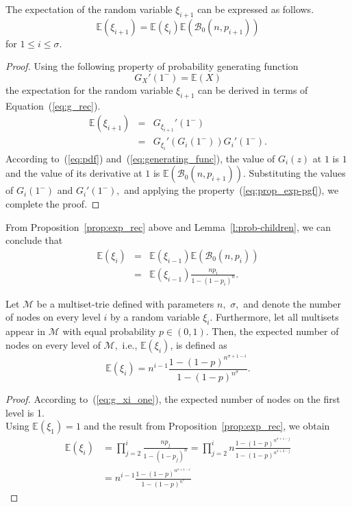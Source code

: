 \documentclass[algorithms,article,accept,pdftex,moreauthors]{Definitions/mdpi}
\begin{document}
\begin{Proposition}\label{prop:exp_rec}
The expectation of the random variable $\xi_{i+1}$ can be expressed 
as follows.
\[
\mathbb{E}(\xi_{i+1}) = \mathbb{E}(\xi_i)\mathbb{E}(\mathcal{B}_0(n,p_{i+1}))
\]
for $1\leq i\leq\sigma.$
\end{Proposition}
\begin{proof}
Using the following property of probability generating function
\begin{equation}\label{eq:prop_exp-pgf}
G_X'(1^-) = \mathbb{E}(X)
\end{equation}
the expectation for the random variable $\xi_{i+1}$ can be derived in terms of Equation~(\ref{eq:g_rec}).
\begin{eqnarray}\label{eq:exp}
\mathbb{E}(\xi_{i+1}) &=& G_{\xi_{i+1}}'(1^-) \nonumber \\
&=& G_{\xi_i}'(G_i(1^-))G_i'(1^-).
\end{eqnarray}
According to~(\ref{eq:pdf}) and~(\ref{eq:generating_func}), the value of $G_i(z)$ at 
$1$ is $1$ and the value of its derivative at $1$ is $\mathbb{E}(\mathcal{B}_0(n,p_{i+1})).$ 
Substituting the values of $G_i(1^-)$ and $G_i'(1^-),$ and applying the 
property~(\ref{eq:prop_exp-pgf}), we complete the proof.
\end{proof}
%
From Proposition~\ref{prop:exp_rec} above and Lemma~\ref{l:prob-children}, we 
can conclude that 
\begin{eqnarray}
\mathbb{E}(\xi_{i}) &=& \mathbb{E}(\xi_{i-1})\mathbb{E}\left( \mathcal{B}_0(n,p_{i}) \right) \nonumber \\
& = & \mathbb{E}(\xi_{i-1})\frac{np_{i}}{1-(1-p_{i})^n}.
\end{eqnarray}

\begin{Theorem}\label{thm:exp_level}
Let $\mathcal{M}$ be a multiset-trie defined with parameters $n,$ $\sigma,$ and denote the number 
of nodes on every level $i$ by a random variable $\xi_i.$ Furthermore, let all multisets appear in 
$\mathcal{M}$ with equal probability $p\in (0,1).$ Then, the expected number 
of nodes on every level of $\mathcal{M},$ i.e., $\mathbb{E}(\xi_i)$, is defined as 
\begin{equation}\label{eq:nodes_level}
\mathbb{E}(\xi_{i}) = n^{i-1} \frac{1-(1-p)^{n^{\sigma +1 -i}}}{1-(1-p)^{n^{\sigma}}}.
\end{equation}
\end{Theorem}
\begin{proof}
According to~(\ref{eq:g_xi_one}), the expected number of nodes on the first level is 1. \\
Using $\mathbb{E}(\xi_1) = 1$ and the result from Proposition~\ref{prop:exp_rec},
we obtain
\begin{align*}
\mathbb{E}(\xi_{i}) &= \prod_{j=2}^{i} \frac{n p_j}{1-(1-p_j)^n}
= \prod_{j=2}^{i} n \frac{1-(1-p)^{n^{\sigma +1-j}}}{1-(1-p)^{n^{\sigma + 2 -j}}} \\
&= n^{i-1} \frac{1-(1-p)^{n^{\sigma +1 -i}}}{1-(1-p)^{n^{\sigma}}}
\end{align*}
\end{proof}
\end{document}
